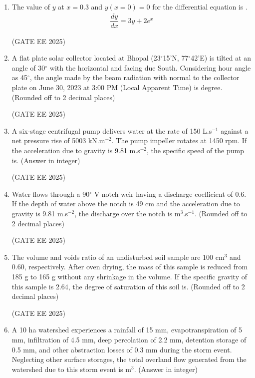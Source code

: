 \documentclass[journal,12pt,onecolumn]{IEEEtran}
\theoremstyle{remark}
\begin{document}
\begin{enumerate}
\item The value of $y$ at $x = 0.3$ and $y(x=0) = 0$ for the differential equation is \underline{\hspace{2cm}}. \begin{align*}
   \dfrac{dy}{dx} = 3y + 2e^x 
\end{align*}

\hfill(GATE EE 2025)

\item A flat plate solar collector located at Bhopal (23$^\circ$15'N, 77$^\circ$42'E) is tilted at an angle of 30$^\circ$ with the horizontal and facing due South. Considering hour angle as 45$^\circ$, the angle made by the beam radiation with normal to the collector plate on June 30, 2023 at 3:00 PM (Local Apparent Time) is \underline{\hspace{2cm}} degree. (Rounded off to 2 decimal places)

\hfill(GATE EE 2025)

\item A six-stage centrifugal pump delivers water at the rate of 150 L.s$^{-1}$ against a net pressure rise of 5003 kN.m$^{-2}$. The pump impeller rotates at 1450 rpm. If the acceleration due to gravity is 9.81 m.s$^{-2}$, the specific speed of the pump is\underline{\hspace{2cm}}. (Answer in integer)

\hfill(GATE EE 2025)

\item Water flows through a 90$^\circ$ V-notch weir having a discharge coefficient of 0.6. If the depth of water above the notch is 49 cm and the acceleration due to gravity is 9.81 m.s$^{-2}$, the discharge over the notch is \underline{\hspace{2cm}} m$^3$.s$^{-1}$. (Rounded off to 2 decimal places)

\hfill(GATE EE 2025)

\item The volume and voids ratio of an undisturbed soil sample are 100 cm$^3$ and 0.60, respectively. After oven drying, the mass of this sample is reduced from 185 g to 165 g without any shrinkage in the volume. If the specific gravity of this sample is 2.64, the degree of saturation of this soil is\underline{\hspace{2cm}}. (Rounded off to 2 decimal places)

\hfill(GATE EE 2025)

\item A 10 ha watershed experiences a rainfall of 15 mm, evapotranspiration of 5 mm, infiltration of 4.5 mm, deep percolation of 2.2 mm, detention storage of 0.5 mm, and other abstraction losses of 0.3 mm during the storm event. Neglecting other surface storages, the total overland flow generated from the watershed due to this storm event is \underline{\hspace{2cm}} m$^3$. (Answer in integer)


\end{enumerate}
\end{document}
